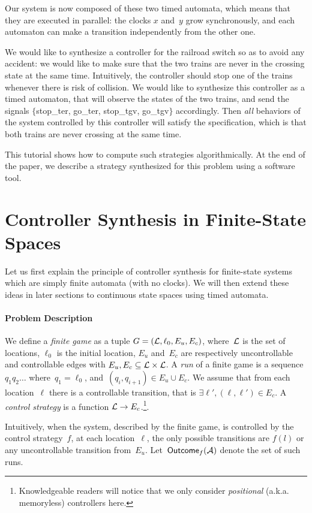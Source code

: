\documentclass{article}
\begin{document}
Our system is now composed of these two timed automata, which means that they are
executed in parallel: the clocks $x$ and~$y$ grow synchronously, and each
automaton can make a transition independently from the other one.

We would like to synthesize a controller for the railroad switch so as
to avoid any accident: we would like to make sure that the two trains are never
in the crossing state at the same time.
Intuitively, the controller should stop one of the trains whenever there is risk
of collision. We would like to synthesize this controller as a timed automaton,
that will observe the states of the two trains, and send the signals
$\{$stop\_ter, go\_ter, stop\_tgv, go\_tgv$\}$ accordingly. Then \emph{all}
behaviors of the system controlled by this controller will satisfy the
specification, which is that both trains are never crossing at the same time.

This tutorial shows how to compute such strategies algorithmically. At the end
of the paper, we describe a strategy synthesized for this problem using a
software tool.
\section{Controller Synthesis in Finite-State Spaces}
Let us first explain the principle of controller synthesis for finite-state
systems which are simply finite automata (with no clocks). We will then extend
these ideas in later sections to continuous state spaces using timed automata.

\paragraph{Problem Description}
We define a \emph{finite game} as a tuple $G = (\mathcal{L}, \ell_0, E_u, E_c)$, where~$\mathcal{L}$ is
the set of locations, $\ell_0$ is the initial location, $E_u$ and~$E_c$ are
respectively uncontrollable and controllable edges with $E_u,E_c \subseteq
\mathcal{L} \times \mathcal{L}$. A \emph{run} of a finite game is a sequence $q_1q_2\ldots$
where~$q_1 = \ell_0$, and~$(q_i,q_{i+1}) \in E_u \cup E_c$.
We assume that from each location~$\ell$ there is a controllable transition, 
that is $\exists \ell', (\ell,\ell') \in E_c$.
A \emph{control strategy} is a function $\mathcal{L} \rightarrow
E_c$.\footnote{Knowledgeable readers will notice that we only consider
\emph{positional} (a.k.a. memoryless) controllers here.}.

Intuitively, when the system, described by the finite game, is controlled by the
control strategy~$f$, at each location~$\ell$, the only possible
transitions are $f(l)$ or any uncontrollable transition from~$E_u$.
Let~$\textsf{Outcome}_f(\mathcal{A})$ denote the set of such runs.
\end{document}
